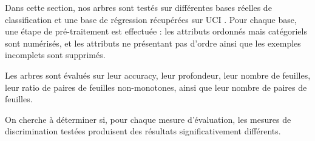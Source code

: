 \documentclass[a4paper]{article}
\begin{document}
Dans cette section, nos arbres sont testés sur différentes bases réelles de
classification et une base de régression récupérées sur UCI \cite{uci}. Pour
chaque base, une étape de pré-traitement est effectuée : les attributs ordonnés
mais catégoriels sont numérisés, et les attributs ne présentant pas d'ordre
ainsi que les exemples incomplets sont supprimés.

Les arbres sont évalués sur leur accuracy, leur profondeur, leur nombre de
feuilles, leur ratio de paires de feuilles non-monotones, ainsi que leur nombre
de paires de feuilles.

On cherche à déterminer si, pour chaque mesure d'évaluation, les mesures de
discrimination testées produisent des résultats significativement différents. \\

\begin{table}
\caption{Description des bases de classification}
\label{tab:descr-classification}
\end{table}
\end{document}
